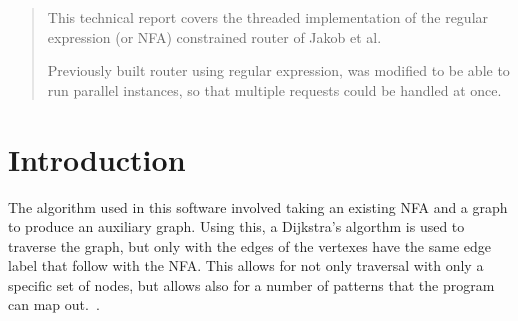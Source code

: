 \documentclass[English]{article}
\theoremstyle{remark}
\numberwithin{equation}{section}
\begin{document}
\begin{abstract}
This technical report covers the threaded implementation of the regular
expression (or NFA) constrained router of Jakob et al.

Previously built router using regular expression, was modified to be able to run parallel instances, so that multiple requests could be handled at once.

\end{abstract}

\section*{Introduction}
\label{sec:introduction}

The algorithm used in this software involved taking an existing NFA and a graph to produce an auxiliary graph. Using this, a Dijkstra's algorthm is used to traverse the graph, but only with the edges of the vertexes have the same edge label that follow with the NFA. This allows for not only traversal with only a specific set of nodes, but allows also for a number of patterns that the program can map out.~\cite{Jacob Constrained Routing.}.
\end{document}
